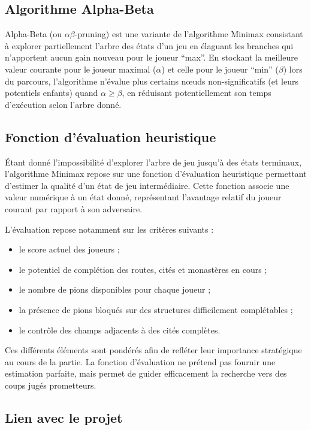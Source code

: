 \documentclass[11pt]{article}
\begin{document}
\subsection{Algorithme Alpha-Beta}

Alpha-Beta (ou $\alpha\beta$-pruning) est une variante de l'algorithme Minimax consistant à explorer partiellement l’arbre des états d’un jeu en élaguant les branches qui n’apportent aucun gain nouveau pour le joueur “max”. 
En stockant la meilleure valeur courante pour le joueur maximal ($\alpha$) et celle pour le joueur “min” ($\beta$) lors du parcours, l’algorithme n’évalue plus certains nœuds non-significatifs (et leurs potentiels enfants) quand $\alpha \geq \beta$, en réduisant potentiellement son temps d'exécution selon l’arbre donné.

\subsection{Fonction d’évaluation heuristique}

Étant donné l’impossibilité d’explorer l’arbre de jeu jusqu’à des états terminaux, l’algorithme Minimax repose sur une fonction d’évaluation heuristique permettant d’estimer la qualité d’un état de jeu intermédiaire.
Cette fonction associe une valeur numérique à un état donné, représentant l’avantage relatif du joueur courant par rapport à son adversaire.

L’évaluation repose notamment sur les critères suivants :
\begin{itemize}
  \item [$\bullet$] le score actuel des joueurs ;
  \item [$\bullet$] le potentiel de complétion des routes, cités et monastères en cours ;
  \item [$\bullet$] le nombre de pions disponibles pour chaque joueur ;
  \item [$\bullet$] la présence de pions bloqués sur des structures difficilement complétables ;
  \item [$\bullet$] le contrôle des champs adjacents à des cités complètes.
\end{itemize}

Ces différents éléments sont pondérés afin de refléter leur importance stratégique au cours de la partie.
La fonction d’évaluation ne prétend pas fournir une estimation parfaite, mais permet de guider efficacement la recherche vers des coups jugés prometteurs.

\subsection{Lien avec le projet}
\end{document}
